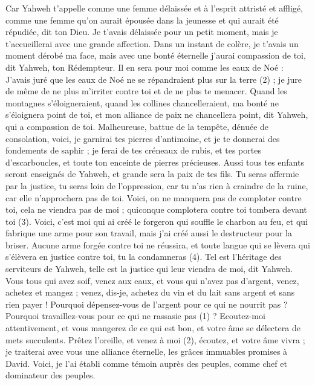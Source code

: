 \begin{multicols}{2}
{Car Yahweh t’appelle comme une femme délaissée et à l’esprit attristé et affligé, comme une femme qu'on aurait épousée dans la jeunesse et qui aurait été répudiée, dit ton Dieu.
Je t’avais délaissée pour un petit moment, mais je t’accueillerai avec une grande affection.
Dans un instant de colère, je t’avais un moment dérobé ma face, mais avec une bonté éternelle j’aurai compassion de toi, dit Yahweh, ton Rédempteur.
Il en sera pour moi comme les eaux de Noé : J’avais juré que les eaux de Noé ne se répandraient plus sur la terre (2) ; je jure de même de ne plus m’irriter contre toi et de ne plus te menacer.
Quand les montagnes s’éloigneraient, quand les collines chancelleraient, ma bonté ne s’éloignera point de toi, et mon alliance de paix ne chancellera point, dit Yahweh, qui a compassion de toi.
Malheureuse, battue de la tempête, dénuée de consolation, voici, je garnirai tes pierres d’antimoine, et je te donnerai des fondements de saphir ;
je ferai de tes créneaux de rubis, et tes portes d’escarboucles, et toute ton enceinte de pierres précieuses.
Aussi tous tes enfants seront enseignés de Yahweh, et grande sera la paix de tes fils.
Tu seras affermie par la justice, tu seras loin de l'oppression, car tu n’as rien à craindre de la ruine, car elle n’approchera pas de toi.
Voici, on ne manquera pas de comploter contre toi, cela ne viendra pas de moi ; quiconque complotera contre toi tombera devant toi (3).
Voici, c'est moi qui ai créé le forgeron qui souffle le charbon au feu, et qui fabrique une arme pour son travail, mais j’ai créé aussi le destructeur pour la briser.
Aucune arme forgée contre toi ne réussira, et toute langue qui se lèvera qui s’élèvera en justice contre toi, tu la condamneras (4). Tel est l'héritage des serviteurs de Yahweh, telle est la justice qui leur viendra de moi, dit Yahweh.
\VerseOne{}Vous tous qui avez soif, venez aux eaux, et vous qui n'avez pas d'argent, venez, achetez et mangez ; venez, dis-je, achetez du vin et du lait sans argent et sans rien payer !
Pourquoi dépensez-vous de l'argent pour ce qui ne nourrit pas ? Pourquoi travaillez-vous pour ce qui ne rassasie pas (1) ? Ecoutez-moi attentivement, et vous mangerez de ce qui est bon, et votre âme se délectera de mets succulents.
Prêtez l’oreille, et venez à moi (2), écoutez, et votre âme vivra ; je traiterai avec vous une alliance éternelle, les grâces immuables promises à David.
Voici, je l'ai établi comme témoin auprès des peuples, comme chef et dominateur des peuples.
}
\end{multicols}
